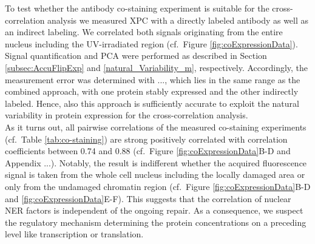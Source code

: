 To test whether the antibody co-staining experiment is suitable for the cross-correlation analysis we measured XPC with a directly labeled antibody as well as an indirect labeling. We correlated both signals originating from the entire nucleus including the UV-irradiated region (cf.\ Figure \ref{fig:coExpressionData}). Signal quantification and PCA were performed as described in Section \ref{subsec:AccuFlipExp} and \ref{natural_Variability_m}, respectively. Accordingly, the measurement error was determined with ..., which lies in the same range as the combined approach, with one protein stably expressed and the other indirectly labeled. Hence, also this approach is sufficiently accurate to exploit the natural variability in protein expression for the cross-correlation analysis.\\ 
As it turns out, all pairwise correlations of the measured co-staining experiments (cf.\ Table \ref{tab:co-staining}) are strong positively correlated with correlation coefficients between 0.74 and 0.88 (cf.\ Figure \ref{fig:coExpressionData}B-D and Appendix ...). Notably, the result is indifferent whether the acquired fluorescence signal is taken from the whole cell nucleus including the locally damaged area or only from the undamaged chromatin region (cf.\ Figure \ref{fig:coExpressionData}B-D and \ref{fig:coExpressionData}E-F). This suggests that the correlation of nuclear NER factors is independent of the ongoing repair. As a consequence, we suspect the regulatory mechanism determining the protein concentrations on a preceding level like transcription or translation.  



